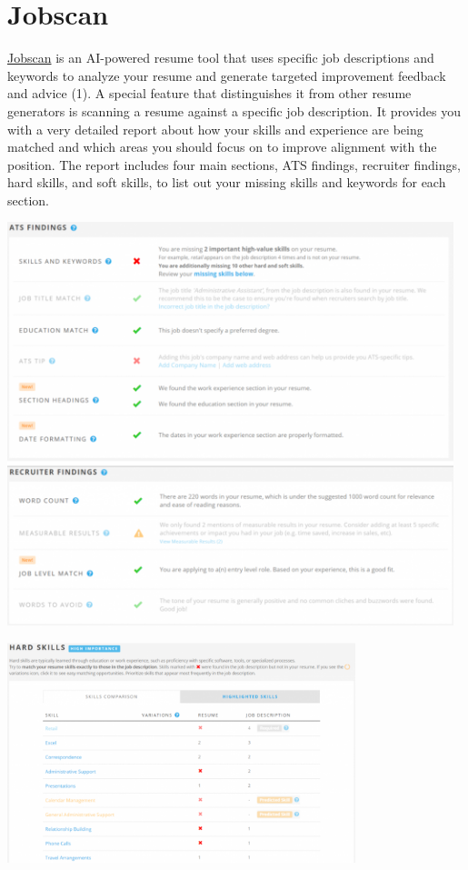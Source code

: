 \documentclass[
]{book}
\begin{document}
\hypertarget{jobscan}{%
\section{Jobscan}\label{jobscan}}

\href{https://www.jobscan.co/resume-score}{Jobscan} is an AI-powered resume tool that uses specific job descriptions and keywords to analyze your resume and generate targeted improvement feedback and advice (1). A special feature that distinguishes it from other resume generators is scanning a resume against a specific job description. It provides you with a very detailed report about how your skills and experience are being matched and which areas you should focus on to improve alignment with the position. The report includes four main sections, ATS findings, recruiter findings, hard skills, and soft skills, to list out your missing skills and keywords for each section.

\includegraphics[width=5.11458in,height=\textheight]{Jobscan findings.png}

\includegraphics[width=3.98958in,height=\textheight]{Jobscan findings 2.png}
\end{document}
